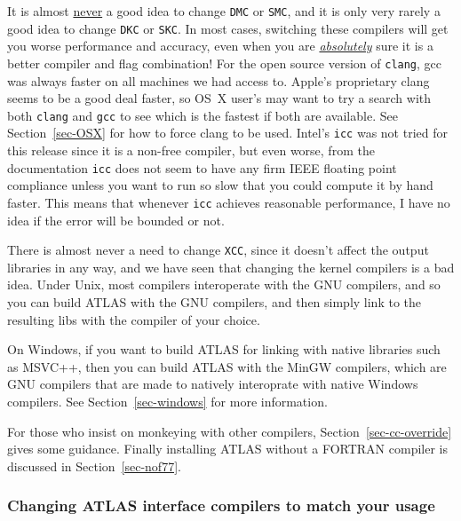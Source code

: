\documentclass[11pt]{article}
\begin{document}
It is almost \underline{never} a good idea to change {\tt DMC} or {\tt SMC},
and it is only very rarely a good idea to change {\tt DKC} or {\tt SKC}.
In most
cases, switching these compilers will get you worse performance and accuracy,
even when you are \underline{\em absolutely} sure it is a better compiler
and flag combination!  For the open source version of {\tt clang}, gcc was
always faster on all machines we had access to.  Apple's proprietary clang
seems to be a good deal faster, so OS~X user's may want to try a search
with both {\tt clang} and {\tt gcc} to see which is the fastest if both
are available.  See Section~\ref{sec-OSX} for how to force clang to be used.
Intel's {\tt icc} was not tried for this release since
it is a non-free compiler, but even worse, from the documentation
{\tt icc} does not seem to have any firm IEEE floating point compliance unless
you want to run so slow that you could compute it by hand faster.  This means
that whenever {\tt icc} achieves reasonable performance, I
have no idea if the error will be bounded or not.  

There is almost never a need to change {\tt XCC}, since it doesn't affect
the output libraries in any way, and we have seen that changing the kernel
compilers is a bad idea.  Under Unix, most compilers interoperate with the
GNU compilers, and so you can build ATLAS with the GNU compilers, and then
simply link to the resulting libs with the compiler of your choice.

On Windows, if you want to build ATLAS for linking with native libraries
such as MSVC++, then you can build ATLAS with the MinGW compilers, which
are GNU compilers that are made to natively interoprate with native Windows
compilers.  See Section~\ref{sec-windows} for more information.

For those who insist on monkeying with
other compilers, Section~\ref{sec-cc-override} gives some guidance.
Finally installing ATLAS without a FORTRAN compiler
is discussed in Section~\ref{sec-nof77}.

\subsubsection{Changing ATLAS interface compilers to match your usage}
\label{sec-cc-iface}
\end{document}
